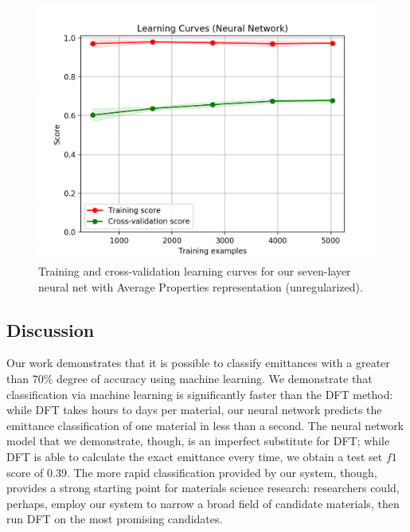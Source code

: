 \documentclass[10pt,twocolumn,letterpaper]{article}
\begin{document}
\begin{figure}[ht]
\centering
\includegraphics[width=\linewidth]{../images/LearningCurves.png}
\caption{Training and cross-validation learning curves for our seven-layer neural net with Average Properties representation (unregularized).}
\label{fig:emittance-calc}
\end{figure}

\subsection{Discussion}

Our work demonstrates that it is possible to classify emittances with a greater than 70\% degree of accuracy using machine learning. We demonstrate that classification via machine learning is significantly faster than the DFT method: while DFT takes hours to days per material, our neural network predicts the emittance classification of one material in less than a second. The neural network model that we demonstrate, though, is an imperfect substitute for DFT; while DFT is able to calculate the exact emittance every time, we obtain a test set $f1$ score of 0.39. The more rapid classification provided by our system, though, provides a strong starting point for materials science research: researchers could, perhaps, employ our system to narrow a broad field of candidate materials, then run DFT on the most promising candidates.
\end{document}
